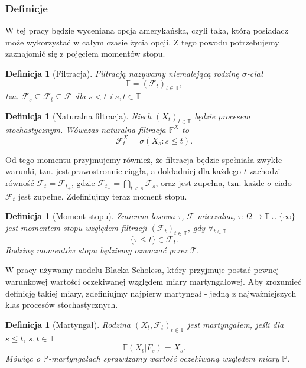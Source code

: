 \documentclass[12pt]{article}
\newtheorem{definition}[theorem]{Definicja}
\begin{document}
\subsubsection{Definicje}
W tej pracy będzie wyceniana opcja amerykańska, czyli taka, którą posiadacz może wykorzystać w całym czasie życia opcji. Z tego powodu potrzebujemy zaznajomić się z pojęciem momentów stopu.

\begin{definition}[Filtracja]
Filtracją nazywamy niemalejącą rodzinę $\sigma$-ciał
$$\mathbb{F} = (\mathcal{F}_t)_{t \in \mathbb{T}},$$
tzn. $\mathcal{F}_s \subseteq \mathcal{F}_t \subseteq \mathcal{F}$ dla $s<t$ i $s,t \in \mathbb{T}$
\end{definition}

\begin{definition}[Naturalna filtracja] 
Niech $(X_t)_{t \in \mathbb{T}}$ będzie procesem stochastycznym. Wówczas naturalna filtracja $\mathbb{F}^X$ to $$\mathcal{F}_t^X = \sigma(X_s: s \leq t).$$
\end{definition}

\noindent Od tego momentu przyjmujemy również, że filtracja będzie spełniała zwykłe warunki, tzn. jest prawostronnie ciągła, a dokładniej dla każdego $t$ zachodzi równość $\mathcal{F}_t = \mathcal{F}_{t_+}$, gdzie $\mathcal{F}_{t_+} = \bigcap_{t<s} \mathcal{F}_s$, oraz jest zupełna, tzn. każde $\sigma$-ciało $\mathcal{F}_t$ jest zupełne.
\newline
\newline
Zdefiniujmy teraz moment stopu.

\begin{definition}[Moment stopu]
Zmienna losowa $\tau$, $\mathcal{F}$-mierzalna, $\tau: \Omega \rightarrow \mathbb{T} \cup \{\infty\}$ jest momentem stopu względem filtracji $(\mathcal{F}_t)_{t \in \mathbb{T}}$, gdy $\forall_{t \in \mathbb{T}}$
$$ \{ \tau \leq t \} \in \mathcal{F}_t.$$ Rodzinę momentów stopu będziemy oznaczać przez $\mathcal{T}.$
\end{definition}

\noindent W pracy używamy modelu Blacka-Scholesa, który przyjmuje postać pewnej warunkowej wartości oczekiwanej względem miary martyngałowej. Aby zrozumieć definicję takiej miary, zdefiniujmy najpierw martyngał - jedną z najważniejszych klas procesów stochastycznych.

\begin{definition}[Martyngał]
Rodzina $(X_t,\mathcal{F}_t)_{t\in \mathbb{T}}$ jest martyngałem, jeśli dla $ s \leq t$, $s,t \in \mathbb{T}$ $$ \mathbb{E}(X_t|F_s) = X_s.$$
Mówiąc o $\mathbb{P}$-martyngałach sprawdzamy wartość oczekiwaną względem miary $\mathbb{P}$.
\end{definition}
\end{document}
